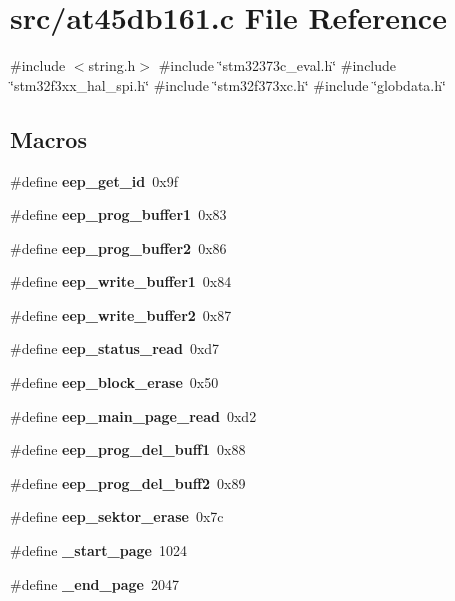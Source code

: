 \section{src/at45db161.c File Reference}
\label{at45db161_8c}
{\ttfamily \#include $<$string.\+h$>$}\newline
{\ttfamily \#include \char`\"{}stm32373c\+\_\+eval.\+h\char`\"{}}\newline
{\ttfamily \#include \char`\"{}stm32f3xx\+\_\+hal\+\_\+spi.\+h\char`\"{}}\newline
{\ttfamily \#include \char`\"{}stm32f373xc.\+h\char`\"{}}\newline
{\ttfamily \#include \char`\"{}globdata.\+h\char`\"{}}\newline
\subsection*{Macros}
\begin{DoxyCompactItemize}
\item 
\#define \textbf{ eep\+\_\+get\+\_\+id}~0x9f
\item 
\#define \textbf{ eep\+\_\+prog\+\_\+buffer1}~0x83
\item 
\#define \textbf{ eep\+\_\+prog\+\_\+buffer2}~0x86
\item 
\#define \textbf{ eep\+\_\+write\+\_\+buffer1}~0x84
\item 
\#define \textbf{ eep\+\_\+write\+\_\+buffer2}~0x87
\item 
\#define \textbf{ eep\+\_\+status\+\_\+read}~0xd7
\item 
\#define \textbf{ eep\+\_\+block\+\_\+erase}~0x50
\item 
\#define \textbf{ eep\+\_\+main\+\_\+page\+\_\+read}~0xd2
\item 
\#define \textbf{ eep\+\_\+prog\+\_\+del\+\_\+buff1}~0x88
\item 
\#define \textbf{ eep\+\_\+prog\+\_\+del\+\_\+buff2}~0x89
\item 
\#define \textbf{ eep\+\_\+sektor\+\_\+erase}~0x7c
\item 
\#define \textbf{ \+\_\+start\+\_\+page}~1024
\item 
\#define \textbf{ \+\_\+end\+\_\+page}~2047
\end{DoxyCompactItemize}
